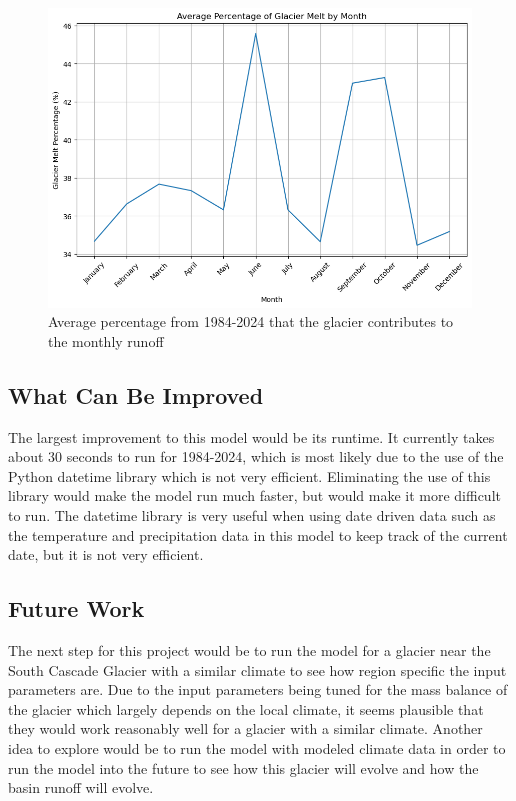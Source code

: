 \documentclass{article}
\begin{document}
\begin{figure}
    \centering
    \includegraphics[width=\textwidth]{Plots/percent_glac_melt_month.png}
    \caption{Average percentage from 1984-2024 that the glacier contributes to the monthly runoff}
    \label{fig:percent_glacier_runoff}
\end{figure}
\FloatBarrier
\subsection{What Can Be Improved}
The largest improvement to this model would be its runtime. It currently takes about 30 seconds to run for 1984-2024, which is most likely 
due to the use of the Python datetime library which is not very efficient. Eliminating the use of this library would make the model run 
much faster, but would make it more difficult to run. The datetime library is very useful when using date driven data such as the temperature 
and precipitation data in this model to keep track of the current date, but it is not very efficient.
\subsection{Future Work}
The next step for this project would be to run the model for a glacier near the South Cascade Glacier with a similar climate to see how region specific the input 
parameters are. Due to the input parameters being tuned for the mass balance of the glacier which largely depends on the local climate, it 
seems plausible that they would work reasonably well for a glacier with a similar climate.
Another idea to explore would be to run the model with modeled climate data in order to run the model into the future to see how this glacier 
will evolve and how the basin runoff will evolve.
\end{document}
